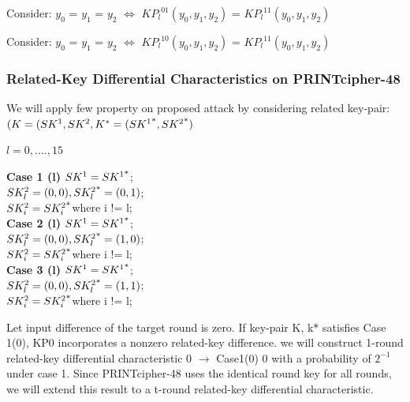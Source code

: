 \documentclass[journal=tosc,preprint]{iacrtrans}
\begin{document}
Consider: \({y_0}\) = \({y_1}\) = \({y_2}\) $\Leftrightarrow$ \({KP_l}^{01}\)\(({y_0},{y_1},{y_2})\) = \({KP_l}^{11}\)\(({y_0},{y_1},{y_2})\)

Consider: \({y_0}\) = \({y_1}\) = \({y_2}\) $\Leftrightarrow$ \({KP_l}^{10}\)\(({y_0},{y_1},{y_2})\) = \({KP_l}^{11}\)\(({y_0},{y_1},{y_2})\)

\subsubsection{Related-Key Differential Characteristics on PRINTcipher-48}

We will apply few property on proposed attack by considering related key-pair: \newline
\((K = (S{K^1},S{K^2}, {K^*} = (S{K^1\textsuperscript{*}},S{K^2\textsuperscript{*}})\)

\(l = 0,....,15\)

\begin{multicols}{3}
	\centering
\textbf{Case 1 (l)}
\(S{K^1}=S{K^1\textsuperscript{*}}\);\\
\(S{K_l^2}=(0,0), S{K_l^2\textsuperscript{*}}=(0,1)\);\\
\(S{K_i^2}=S{K_i^2\textsuperscript{*}}\)where i != l;\\

\textbf{Case 2 (l)}
\(S{K^1}=S{K^1\textsuperscript{*}}\);\\
\(S{K_l^2}=(0,0), S{K_l^2\textsuperscript{*}}=(1,0)\);\\
\(S{K_i^2}=S{K_i^2\textsuperscript{*}}\)where i != l;\\

\textbf{Case 3 (l)}
\(S{K^1}=S{K^1\textsuperscript{*}}\);\\
\(S{K_l^2}=(0,0), S{K_l^2\textsuperscript{*}}=(1,1)\);\\
\(S{K_i^2}=S{K_i^2\textsuperscript{*}}\)where i != l;\\
\end{multicols}


Let input difference of the target round is zero. If key-pair K, k$*$ satisfies Case 1(0), KP0 incorporates a nonzero related-key difference. we will construct 1-round related-key differential characteristic 0 $\rightarrow$ Case1(0) 0 with a probability of
\(2^{-1}\)under case 1. Since PRINTcipher-48 uses the identical round key for all
rounds, we will extend this result to a t-round related-key differential
characteristic.
\end{document}
